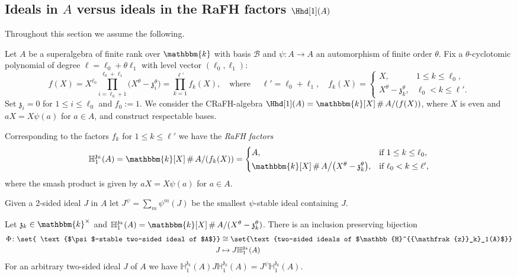 \documentclass[a4paper,11pt]{amsart}
\newcommand\cB{\mathcal{B}}
\numberwithin{equation}{subsection}
\theoremstyle{definition}
\theoremstyle{theorem}
\theoremstyle{remark}
\newcommand\kapp{{\mathfrak{z}}}
\newcommand\HH{\mathbb{H}}
\newcommand\kk{\mathbbm{k}}
\DeclareMathOperator\Smash{\#}
\begin{document}
\subsection{Ideals in $A$ versus ideals in the RaFH factors $\Hhd[1](A)$ }
Throughout this section we assume the following.
\begin{Setup}\label{setupresp}
 Let  $A$ be a superalgebra of finite rank over $\kk$ with basis $\cB$ and
$\psi\colon A\to A$ an automorphism of finite order $\theta$. Fix a $\theta$-cyclotomic polynomial of degree $\ell=\ell_0+\theta\ell_1$ with level vector $(\ell_0, \ell_1)$:
\begin{equation*}
  f(X)=X^{\ell_0}\prod_{i=\ell_0+1}^{\ell_0+\ell_1}\bigl(X^{\theta}-\kapp_i^{\theta}\bigr)
      =\prod_{k=1}^{\ell'}f_k(X),
  \quad\text{where }\quad\ell'=\ell_0+\ell_1,\quad
  f_k(X)=\begin{cases}X, & 1\le k\le\ell_0,\\ X^{\theta}-\kapp_k^{\theta}, & \ell_0<k\le\ell'.\end{cases}
\end{equation*}
Set $\kapp_i=0$ for $1\le i\le\ell_0$ and $f_0:=1$. We consider  the CRaFH-algebra $\Hhd[1](A)=\kk[X]\Smash A/(f(X))$, where $X$ is even and $aX=X\psi(a)$ for $a\in A$, and construct respectable bases.
\end{Setup}

\begin{Definition}
Corresponding  to the factors $f_k$ for $1\le k\le\ell'$ we have the \emph{RaFH factors}
  \[
    \HH^{\kapp_k}_1(A)=\kk[X]\Smash A/(f_k(X))=\begin{cases}
      A, & \text{if }1\le k\le\ell_0,\\[2pt]
      \kk[X]\Smash A\big/\bigl(X^{\theta}-\kapp_k^{\theta}\bigr), & \text{if }\ell_0<k\le\ell',
    \end{cases}
  \]
  where the smash product is given by $aX=X\psi(a)$ for $a\in A$.
\end{Definition}

Given a 2-sided ideal $J$ in $A$ let $J^{\psi}=\sum_{m}\psi^{m}(J)$ be the smallest
$\psi$-stable ideal containing $J$.

\begin{Lemma}\label{bijideals}
  Let $\kapp_k\in\kk^\times$ and $\HH^{\kapp_k}_1(A)=\kk[X]\Smash A/(X^{\theta}-\kapp_k^{\theta})$. There is an inclusion preserving  bijection
  \begin{align*}
\Phi\colon  \set{ \text{$\psi$-stable two-sided ideal of $A$}}&\cong\set{\text{two-sided ideals of
      $\HH^{\kapp_k}_1(A)$}}\\
      J&\mapsto J\HH^{\kapp_k}_1(A)
      \end{align*}
 For an arbitrary two-sided ideal $J$ of $A$ we have  $\HH^{\kapp_k}_1(A)J\HH^{\kapp_k}_1(A)=J^{\psi}\HH^{\kapp_k}_1(A)$.
\end{Lemma}
\end{document}
